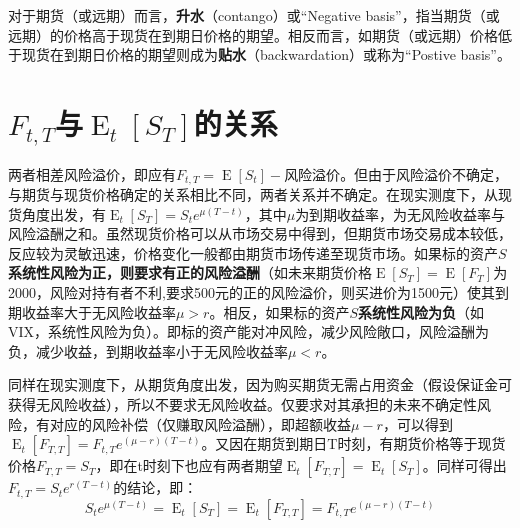 \documentclass[11pt]{article}
\newcommand{\E}{\operatorname{E}}
\begin{document}
对于期货（或远期）而言，\textbf{升水}（contango）或“Negative basis”，指当期货（或远期）的价格高于现货在到期日价格的期望。相反而言，如期货（或远期）价格低于现货在到期日价格的期望则成为\textbf{贴水}（backwardation）或称为“Postive basis”。

\section{$F_{t,T}$与$\E_t[S_T]$的关系}
两者相差风险溢价，即应有$F_{t,T}=\E[S_t]-\text{风险溢价}$。但由于风险溢价不确定，与期货与现货价格确定的关系相比不同，两者关系并不确定。在现实测度下，从现货角度出发，有$\E_t[S_T]=S_t e^{\mu(T-t)}$，其中$\mu$为到期收益率，为无风险收益率与风险溢酬之和。虽然现货价格可以从市场交易中得到，但期货市场交易成本较低，反应较为灵敏迅速，价格变化一般都由期货市场传递至现货市场。如果标的资产$S$\textbf{系统性风险为正，则要求有正的风险溢酬}（如未来期货价格$\E[S_T]=\E[F_T]$为2000，风险对持有者不利,要求500元的正的风险溢价，则买进价为1500元）使其到期收益率大于无风险收益率$\mu>r$。相反，如果标的资产$S$\textbf{系统性风险为负}（如VIX，系统性风险为负）。即标的资产能对冲风险，减少风险敞口，风险溢酬为负，减少收益，到期收益率小于无风险收益率$\mu<r$。

同样在现实测度下，从期货角度出发，因为购买期货无需占用资金（假设保证金可获得无风险收益），所以不要求无风险收益。仅要求对其承担的未来不确定性风险，有对应的风险补偿（仅赚取风险溢酬），即超额收益$\mu-r$，可以得到$\E_t[F_{T,T}] = F_{t,T} e^{(\mu-r)(T-t)}$。又因在期货到期日T时刻，有期货价格等于现货价格$F_{T,T} = S_T$，即在t时刻下也应有两者期望$\E_t[F_{T,T}] = \E_t[S_T]$。同样可得出$F_{t,T} = S_t e^{r(T-t)}$的结论，即：
\begin{equation*}
    S_t e^{\mu(T-t)} = \E_t[S_T] = \E_t[F_{T,T}] = F_{t,T} e^{(\mu-r)(T-t)}
\end{equation*}
\end{document}

